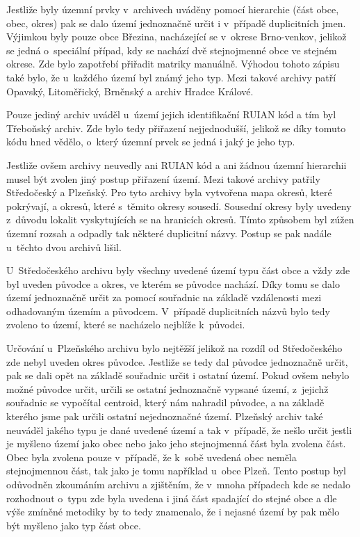 Jestliže byly územní prvky v~archivech uváděny pomocí hierarchie (část obce, obec, okres) pak se dalo území jednoznačně určit i v~případě duplicitních jmen. Výjimkou byly pouze obce Březina, nacházející se v~okrese Brno-venkov, jelikož se jedná o~speciální případ, kdy se nachází dvě stejnojmenné obce ve stejném okrese. Zde bylo zapotřebí přiřadit matriky manuálně. Výhodou tohoto zápisu také bylo, že u~každého území byl známý jeho typ. Mezi takové archivy patří Opavský, Litoměřický, Brněnský a archiv Hradce Králové.

Pouze jediný archiv uváděl u~území jejich identifikační RUIAN kód a tím byl Třeboňský archiv. Zde bylo tedy přiřazení nejjednodušší, jelikož se díky tomuto kódu hned vědělo, o~který územní prvek se jedná i jaký je jeho typ. 

Jestliže ovšem archivy neuvedly ani RUIAN kód a ani žádnou územní hierarchii musel být zvolen jiný postup přiřazení území. Mezi takové archivy patřily Středočeský a Plzeňský. Pro tyto archivy byla vytvořena mapa okresů, které pokrývají, a okresů, které s~těmito okresy sousedí. Sousední okresy byly uvedeny z~důvodu lokalit vyskytujících se na hranicích okresů. Tímto způsobem byl zúžen územní rozsah a odpadly tak některé duplicitní názvy. Postup se pak nadále u~těchto dvou archivů lišil. 

U~Středočeského archivu byly všechny uvedené území typu část obce a vždy zde byl uveden původce a okres, ve kterém se původce nachází. Díky tomu se dalo území jednoznačně určit za pomocí souřadnic na základě vzdálenosti mezi odhadovaným územím a původcem. V~případě duplicitních názvů bylo tedy zvoleno to území, které se nacházelo nejblíže k~původci.

Určování u~Plzeňského archivu bylo nejtěžší jelikož na rozdíl od Středočeského zde nebyl uveden okres původce. Jestliže se tedy dal původce jednoznačně určit, pak se dali opět na základě souřadnic určit i ostatní území. Pokud ovšem nebylo možné původce určit, určili se ostatní jednoznačně vypsané území, z~jejichž souřadnic se vypočítal centroid, který nám nahradil původce, a na základě kterého jsme pak určili ostatní nejednoznačné území. Plzeňský archiv také neuváděl jakého typu je dané uvedené území a tak v~případě, že nešlo určit jestli je myšleno území jako obec nebo jako jeho stejnojmenná část byla zvolena část. Obec byla zvolena pouze v~případě, že k~sobě uvedená obec neměla stejnojmennou část, tak jako je tomu například u~obce Plzeň. Tento postup byl odůvodněn zkoumáním archivu a zjištěním, že v~mnoha případech kde se nedalo rozhodnout o~typu zde byla uvedena i jiná část spadající do stejné obce a dle výše zmíněné metodiky by to tedy znamenalo, že i nejasné území by pak mělo být myšleno jako typ část obce.

